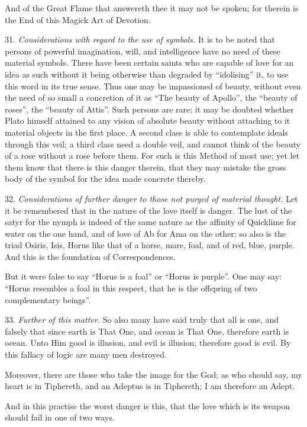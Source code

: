 And of the Great Flame that answereth thee it may not be spoken; for therein is the End of this Magick Art of Devotion.

31. \textit{Considerations with regard to the use of symbols.} It is to be noted that persons of powerful imagination, will, and intelligence have no need of these material symbols. There have been certain saints who are capable of love for an idea as such without it being otherwise than degraded by \enquote{idolising} it, to use this word in its true sense. Thus one may be impassioned of beauty, without even the need of so small a concretion of it as \enquote{The beauty of Apollo}, the \enquote{beauty of roses}, the \enquote{beauty of Attis}. Such persons are rare; it may be doubted whether Plato himself attained to any vision of absolute beauty without attaching to it material objects in the first place. A second class is able to contemplate ideals through this veil; a third class need a double veil, and cannot think of the beauty of a rose without a rose before them. For such is this Method of most use; yet let them know that there is this danger therein, that they may mistake the gross body of the symbol for the idea made concrete thereby.

32. \textit{Considerations of further danger to those not purged of material thought.} Let it be remembered that in the nature of the love itself is danger. The lust of the satyr for the nymph is indeed of the same nature as the affinity of Quicklime for water on the one hand, and of love of Ab for Ama on the other; so also is the triad Osiris, Isis, Horus like that of a horse, mare, foal, and of red, blue, purple. And this is the foundation of Correspondences.

But it were false to say \enquote{Horus is a foal} or \enquote{Horus is purple}. One may say: \enquote{Horus resembles a foal in this respect, that he is the offspring of two complementary beings}.

33. \textit{Further of this matter.} So also many have said truly that all is one, and falsely that since earth is That One, and ocean is That One, therefore earth is ocean. Unto Him good is illusion, and evil is illusion; therefore good is evil. By this fallacy of logic are many men destroyed.

Moreover, there are those who take the image for the God; as who should say, my heart is in Tiphereth, and an Adeptus is in Tiphereth; I am therefore an Adept.

And in this practise the worst danger is this, that the love which is its weapon should fail in one of two ways.

